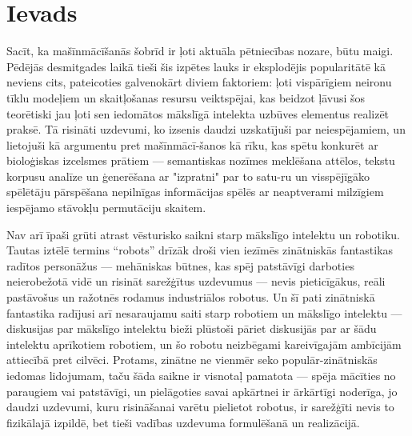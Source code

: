 \documentclass[12pt, a4paper]{article}
\numberwithin{equation}{section} %
\begin{document}

\newpage
\tableofcontents
\thispagestyle{empty}
\newpage
\setcounter{page}{3}


\section{Ievads}

Sacīt, ka mašīnmācīšanās šobrīd ir ļoti aktuāla pētniecības nozare, būtu maigi. Pēdējās desmitgades laikā tieši šis izpētes lauks ir eksplodējis popularitātē kā neviens cits, pateicoties galvenokārt diviem faktoriem: ļoti vispārīgiem neironu tīklu modeļiem un skaitļošanas resursu veiktspējai, kas beidzot ļāvusi šos teorētiski jau ļoti sen\cite{mcculloch1943logical}\cite{linnainmaa1970representation}\cite{fukushima1988neocognitron} iedomātos mākslīgā intelekta uzbūves elementus realizēt praksē. Tā risināti uzdevumi, ko izsenis daudzi uzskatījuši par neiespējamiem, un lietojuši kā argumentu pret mašīnmācī-šanos kā rīku, kas spētu konkurēt ar bioloģiskas izcelsmes prātiem --- semantiskas nozīmes meklēšana attēlos\cite{krizhevsky2012imagenet}, tekstu korpusu analīze un ģenerēšana ar "izpratni" par to satu-ru\cite{vaswani2017attention} un visspējīgāko spēlētāju pārspēšana nepilnīgas informācijas spēlēs ar neaptverami milzīgiem iespējamo stāvokļu permutāciju skaitem\cite{silver2016mastering}.

Nav arī īpaši grūti atrast vēsturisko saikni starp mākslīgo intelektu un robotiku. Tautas iztēlē termins ``robots'' drīzāk droši vien iezīmēs zinātniskās fantastikas radītos personāžus --- mehāniskas būtnes, kas spēj patstāvīgi darboties neierobežotā vidē un risināt sarežģītus uzdevumus --- nevis pieticīgākus, reāli pastāvošus un ražotnēs rodamus industriālos robotus. Un šī pati zinātniskā fantastika radījusi arī nesaraujamu saiti starp robotiem un mākslīgo intelektu\cite{asimov2004robot} --- diskusijas par mākslīgo intelektu bieži plūstoši pāriet diskusijās par ar šādu intelektu aprīkotiem robotiem, un šo robotu neizbēgami kareivīgajām ambīcijām attiecībā pret cilvēci. Protams, zinātne ne vienmēr seko populār-zinātniskās iedomas lidojumam, taču šāda saikne ir visnotaļ pamatota --- spēja mācīties no paraugiem vai patstāvīgi, un pielāgoties savai apkārtnei ir ārkārtīgi noderīga, jo daudzi uzdevumi, kuru risināšanai varētu pielietot robotus, ir sarežģīti nevis to fizikālajā izpildē, bet tieši vadības uzdevuma formulēšanā un realizācijā.
\end{document}
